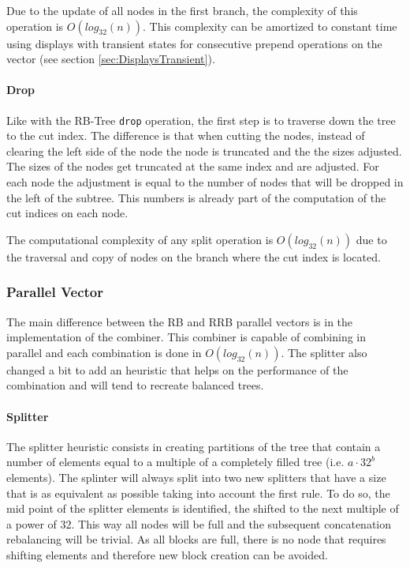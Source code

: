 Due to the update of all nodes in the first branch, the complexity of this operation is $O(log_{32}(n))$. This complexity can be amortized to constant time using displays with transient states for consecutive prepend operations on the vector (see section \ref{sec:DisplaysTransient}).


\paragraph{Drop}

Like with the RB-Tree \texttt{drop} operation, the first step is to traverse down the tree to the cut index. The difference is that when cutting the nodes, instead of clearing the left side of the node the node is truncated and the the sizes adjusted. The sizes of the nodes get truncated at the same index and are adjusted. For each node the adjustment is equal to the number of nodes that will be dropped in the left of the subtree. This numbers is already part of the computation of the cut indices on each node. 

The computational complexity of any split operation is $O(log_{32}(n))$ due to the traversal and copy of nodes on the branch where the cut index is located.


\subsubsection{Parallel Vector}
The main difference between the RB and RRB parallel vectors is in the implementation of the combiner. This combiner is capable of combining in parallel and each combination is done in $O(log_{32}(n))$. The splitter also changed a bit to add an heuristic that helps on the performance of the combination and will tend to recreate balanced trees. 

\paragraph{Splitter}
The splitter heuristic consists in creating partitions of the tree that contain a number of elements equal to a multiple of a completely filled tree (i.e. $a \cdot 32^b$ elements). The splinter will always split into two new splitters that have a size that is as equivalent as possible taking into account the first rule. To do so, the mid point of the splitter elements is identified, the shifted to the next multiple of a power of 32. This way all nodes will be full and the subsequent concatenation rebalancing will be trivial. As all blocks are full, there is no node that requires shifting elements and therefore new block creation can be avoided.

